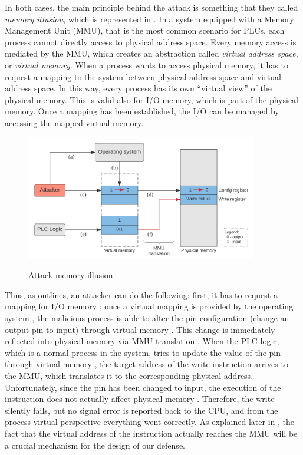 In both cases, the main principle behind the attack is something that they called \emph{memory illusion}, which is represented in .
In a system equipped with a Memory Management Unit (MMU), that is the most common scenario for PLCs, each process cannot directly access to physical address space.
Every memory access is mediated by the MMU, which creates an abstraction called \emph{virtual address space}, or \emph{virtual memory}.
When a process wants to access physical memory, it has to request a mapping to the system between physical address space and virtual address space.
In this way, every process has its own ``virtual view'' of the physical memory. This is valid also for I/O memory, which is part of the physical memory.
Once a mapping has been established, the I/O can be managed by accessing the mapped virtual memory.
\begin{figure}[h]
\centerline{
\includegraphics[width=0.9\textwidth]{res/illusion}}
\caption{Attack memory illusion \label{fig:illusion}}
{\ignorespaces\label{fig:mapping-request}}
{\ignorespaces\label{fig:mapping-provided}}
{\ignorespaces\label{fig:conf-change}}
{\ignorespaces\label{fig:phys-change}}
{\ignorespaces\label{fig:virt-write}}
{\ignorespaces\label{fig:write-failure}}
\end{figure}
Thus, as  outlines, an attacker can do the following: first, it has to request a mapping for I/O memory ;
once a virtual mapping is provided by the operating system , the malicious process is able to alter the pin configuration (\eg change an output pin to input)
through virtual memory . This change is immediately reflected into physical memory via MMU translation . When the PLC logic,
which is a normal process in the system, tries to update the value of the pin through virtual memory ,
the target address of the write instruction arrives to the MMU, which translates it to the corresponding physical address.
Unfortunately, since the pin has been changed to input, the execution of the instruction does not actually affect physical memory .
Therefore, the write silently fails, but no signal error is reported back to the CPU, and from the process virtual perspective everything went correctly.
As explained later in , the fact that the virtual address of the instruction actually reaches the MMU will be a crucial mechanism
for the design of our defense.

